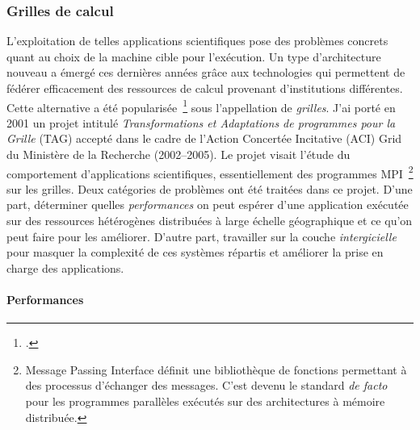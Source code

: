 \subsubsection{Grilles de calcul}

L'exploitation de telles applications  scientifiques pose des problèmes concrets
quant au  choix de  la machine  cible pour  l'exécution. Un  type d'architecture
nouveau a émergé  ces dernières années grâce aux technologies  qui permettent de
fédérer  efficacement   des  ressources   de  calcul   provenant  d'institutions
différentes.  Cette alternative  a été  popularisée~\footcite{Foster97,Foster98}
sous  l'appellation de  \emph{grilles}. J'ai  porté en  2001 un  projet intitulé
\textit{Transformations  et  Adaptations de  programmes  pour  la Grille}  (TAG)
accepté dans le  cadre de l'Action Concertée Incitative (ACI)  Grid du Ministère
de  la  Recherche  (2002--2005).  Le   projet  visait  l'étude  du  comportement
d'applications  scientifiques,  essentiellement des  programmes  MPI~\footnote{%
  Message Passing Interface  définit une bibliothèque de  fonctions permettant à
  des processus  d'échanger des  messages. C'est  devenu le  standard \textit{de
    facto}  pour les  programmes  parallèles exécutés  sur  des architectures  à
  mémoire distribuée.}  sur les  grilles. Deux catégories  de problèmes  ont été
traitées dans ce  projet. D'une part, déterminer  quelles \emph{performances} on
peut  espérer   d'une  application  exécutée  sur   des  ressources  hétérogènes
distribuées  à large  échelle  géographique  et ce  qu'on  peut  faire pour  les
améliorer.   D'autre part,  travailler sur  la couche  \emph{intergicielle} pour
masquer la complexité  de ces systèmes répartis et améliorer  la prise en charge
des applications.


\paragraph{Performances} 

